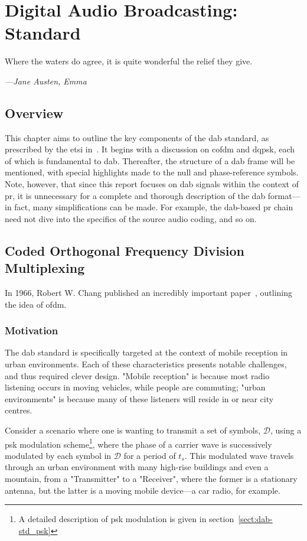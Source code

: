 \documentclass[class=report,11pt,crop=false]{standalone}
\begin{document}
\ifstandalone
\tableofcontents
\fi
\chapter{Digital Audio Broadcasting: Standard}
\epigraph{Where the waters do agree, it is quite wonderful the relief they give.}%
{\emph{---Jane Austen, Emma}}

\section{Overview}
This chapter aims to outline the key components of the \gls{dab} standard, as prescribed by the \gls{etsi} in~\cite{dabstandard}. It begins with a discussion on \gls{cofdm} and \gls{dqpsk}, each of which is fundamental to \gls{dab}. Thereafter, the structure of a \gls{dab} frame will be mentioned, with special highlights made to the null and phase-reference symbols. Note, however, that since this report focuses on \gls{dab} signals within the context of \gls{pr}, it is unnecessary for a complete and thorough description of the \gls{dab} format---in fact, many simplifications can be made. For example, the \gls{dab}-based \gls{pr} chain need not dive into the specifics of the source audio coding, and so on.

\section{Coded Orthogonal Frequency Division Multiplexing}
In 1966, Robert W. Chang published an incredibly important paper~\cite{Chang1966}, outlining the idea of \gls{ofdm}.

\subsection{Motivation}

The \gls{dab} standard is specifically targeted at the context of mobile reception in urban environments. Each of these characteristics presents notable challenges, and thus required clever design. "Mobile reception" is because most radio listening occurs in moving vehicles, while people are commuting; "urban environments" is because many of these listeners will reside in or near city centres.

Consider a scenario where one is wanting to transmit a set of symbols, \(\mathcal{D}\), using a \gls{psk} modulation scheme\footnote{A detailed description of \gls{psk} modulation is given in section~\ref{sect:dab-std_psk}}, where the phase of a carrier wave is successively modulated by each symbol in \(\mathcal{D}\) for a period of \(t_s\). This modulated wave travels through an urban environment with many high-rise buildings and even a mountain, from a "Transmitter" to a "Receiver", where the former is a stationary antenna, but the latter is a moving mobile device---a car radio, for example.
\end{document}
